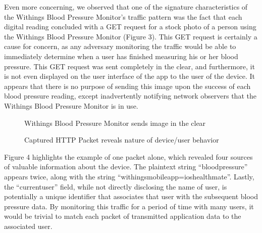 Even more concerning, we observed that one of the signature characteristics of the Withings Blood Pressure Monitor's traffic pattern was the fact that each digital reading concluded with a GET request for a stock photo of a person using the Withings Blood Pressure Monitor (Figure 3). This GET request is certainly a cause for concern, as any adversary monitoring the traffic would be able to immediately determine when a user has finished measuring his or her blood pressure. This GET request was sent completely in the clear, and furthermore, it is not even displayed on the user interface of the app to the user of the device. It appears that there is no purpose of sending this image upon the success of each blood pressure reading, except inadvertently notifying network observers that the Withings Blood Pressure Monitor is in use. 

\begin{figure}
  \caption{Withings Blood Pressure Monitor sends image in the clear}
  \centering
\end{figure}

\begin{figure}
  \caption{Captured HTTP Packet reveals nature of device/user behavior}
  \centering
\end{figure}

Figure 4 highlights the example of one packet alone, which revealed four sources of valuable information about the device. The plaintext string ``blood\textunderscore pressure'' appears twice, along with the string ``withings\textunderscore mobile\textunderscore app=ios\textunderscore healthmate''. Lastly, the ``current\textunderscore user'' field, while not directly disclosing the name of user, is potentially a unique identifier that associates that user with the subsequent blood pressure data. By monitoring this traffic for a period of time with many users, it would be trivial to match each packet of transmitted application data to the associated user. 



